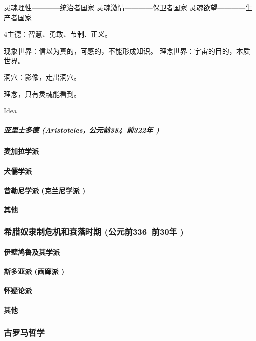 \documentclass[UTF8]{../RepresentationUniverse}
\begin{document}
            灵魂理性————统治者国家
            灵魂激情————保卫者国家
            灵魂欲望————生产者国家
    
            4主德：智慧、勇敢、节制、正义。
    
            现象世界：信以为真的，可感的，不能形成知识。
            理念世界：宇宙的目的，本质世界。
    
            洞穴：影像，走出洞穴。
    
            理念，只有灵魂能看到。
    
            Idea

            \subparagraph{亚里士多德 (Aristoteles，公元前384~前322年 )}
        \paragraph{麦加拉学派}
        \paragraph{犬儒学派}
        \paragraph{昔勒尼学派 (克兰尼学派 )}
        \paragraph{其他}


    \subsubsection{希腊奴隶制危机和衰落时期 (公元前336~前30年 )}
        \paragraph{伊壁鸠鲁及其学派}
        \paragraph{斯多亚派 (画廊派 )}
        \paragraph{怀疑论派}
        \paragraph{其他}

    \subsubsection{古罗马哲学}
\end{document}
